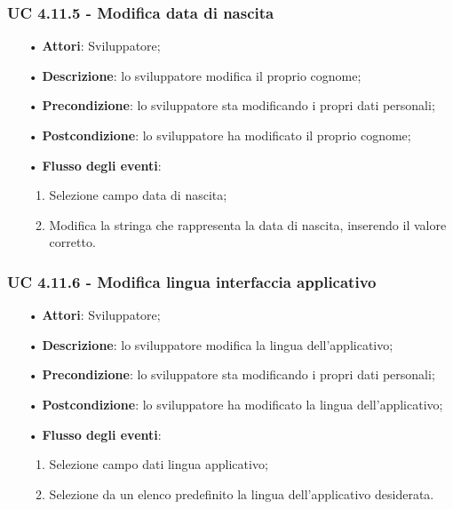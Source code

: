 \subsubsection{UC 4.11.5 - Modifica data di nascita}
\begin{itemize}
	\item[•]\textbf{Attori}: Sviluppatore;
	\item[•]\textbf{Descrizione}: lo sviluppatore modifica il proprio cognome;
	\item[•]\textbf{Precondizione}: lo sviluppatore sta modificando i propri dati personali;
	\item[•]\textbf{Postcondizione}: lo sviluppatore ha modificato il proprio cognome; 
	\item[•]\textbf{Flusso degli eventi}: 
	\begin{enumerate}
		\item Selezione campo data di nascita;
		\item Modifica la stringa che rappresenta la data di nascita, inserendo il valore corretto.
	\end{enumerate}
\end{itemize}
\subsubsection{UC 4.11.6 - Modifica lingua interfaccia applicativo}
\begin{itemize}
	\item[•]\textbf{Attori}: Sviluppatore;
	\item[•]\textbf{Descrizione}: lo sviluppatore modifica la lingua dell'applicativo;
	\item[•]\textbf{Precondizione}: lo sviluppatore sta modificando i propri dati personali;
	\item[•]\textbf{Postcondizione}: lo sviluppatore ha modificato la lingua dell'applicativo; 
	\item[•]\textbf{Flusso degli eventi}: 
	\begin{enumerate}
		\item Selezione campo dati lingua applicativo;
		\item Selezione da un elenco predefinito la lingua dell'applicativo desiderata.
	\end{enumerate}
\end{itemize}

